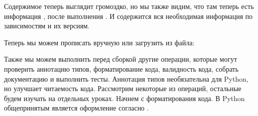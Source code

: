 \documentclass[letterpaper,10pt,russian]{sphinxmanual}
\begin{document}
\sphinxAtStartPar
Содержимое  теперь выглядит громоздко, но мы также видим, что там теперь есть информация , после выполнения . И содержится вся необходимая информация по зависимостям и их версиям.

\sphinxAtStartPar
Теперь мы можем прописать  вручную или загрузить из файла:

\begin{sphinxVerbatim}[commandchars=\\\{\}]
 
   

  

     
      

 
       
       
          
         \PYG{p}{[}    \PYG{p}{]}
\end{sphinxVerbatim}

\sphinxAtStartPar
Также мы можем выполнить перед сборкой другие операции, которые могут проверить аннотацию типов, форматирование кода, валидность кода, собрать документацию и выполнить тесты. Аннотация типов необязательна для Python, но улучшает читаемость кода. Рассмотрим некоторые из операций, остальные будем изучать на отдельных уроках. Начнем с форматирования кода. В Python общепринятым является оформление согласно .
\end{document}
